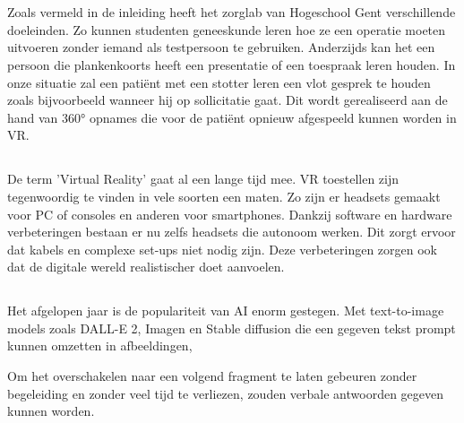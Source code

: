\chapter{}%
\label{ch:stand-van-zaken}



Zoals vermeld in de inleiding heeft het zorglab van Hogeschool Gent verschillende doeleinden. Zo kunnen studenten geneeskunde leren hoe ze een operatie moeten uitvoeren zonder iemand als testpersoon te gebruiken. Anderzijds kan het een persoon die plankenkoorts heeft een presentatie of een toespraak leren houden. In onze situatie zal een patiënt met een stotter leren een vlot gesprek te houden zoals bijvoorbeeld wanneer hij op sollicitatie gaat. Dit wordt gerealiseerd aan de hand van 360° opnames die voor de patiënt opnieuw afgespeeld kunnen worden in VR.

\section{}%
De term 'Virtual Reality' gaat al een lange tijd mee.
VR toestellen zijn tegenwoordig te vinden in vele soorten een maten. Zo zijn er headsets gemaakt voor PC of consoles en anderen voor smartphones. Dankzij software en hardware verbeteringen bestaan er nu zelfs headsets die autonoom werken. Dit zorgt ervoor dat kabels en complexe set-ups niet nodig zijn. Deze verbeteringen zorgen ook dat de digitale wereld realistischer doet aanvoelen.

\section{}%
Het afgelopen jaar is de populariteit van AI enorm gestegen. Met text-to-image models zoals DALL-E 2, Imagen en Stable diffusion die een gegeven tekst prompt kunnen omzetten in afbeeldingen,

Om het overschakelen naar een volgend fragment te laten gebeuren zonder begeleiding en zonder veel tijd te verliezen, zouden verbale antwoorden gegeven kunnen worden.

